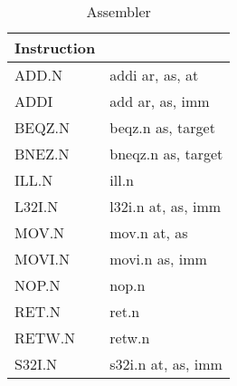 \begin{longtable}{|p{5cm}|p{5cm}|}
\caption{Assembler\label{long}}\\
\hline
Instruction & \\
\hline
ADD.N & addi ar, as, at\\ \hline
ADDI & add ar, as, imm\\ \hline
BEQZ.N & beqz.n as, target\\ \hline
BNEZ.N & bneqz.n as, target\\ \hline
ILL.N & ill.n\\ \hline
L32I.N & l32i.n at, as, imm\\ \hline
MOV.N & mov.n at, as\\ \hline
MOVI.N & movi.n as, imm\\ \hline
NOP.N & nop.n\\ \hline
RET.N & ret.n\\ \hline
RETW.N & retw.n\\ \hline
S32I.N & s32i.n at, as, imm\\ \hline
\end{longtable}